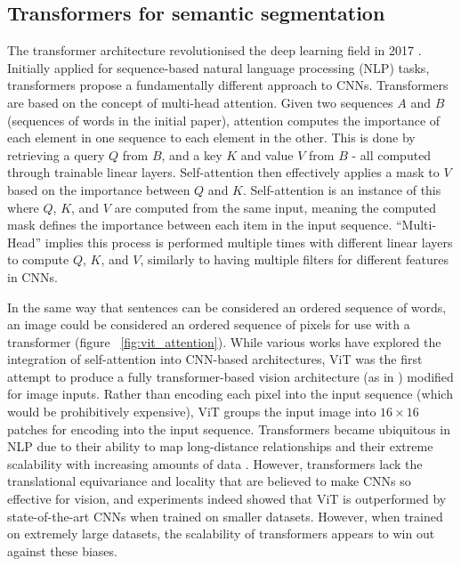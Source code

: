 \documentclass[a4paper,12pt]{report}
\begin{document}
    \subsection{Transformers for semantic segmentation}
    
    The transformer architecture revolutionised the deep learning field in 2017 \cite{vaswani_attention_2017}. Initially applied for sequence-based natural language processing (NLP) tasks, transformers propose a fundamentally different approach to CNNs. Transformers are based on the concept of multi-head attention. Given two sequences $A$ and $B$ (sequences of words in the initial paper), attention computes the importance of each element in one sequence to each element in the other. This is done by retrieving a query $Q$ from $B$, and a key $K$ and value $V$ from $B$ - all computed through trainable linear layers. Self-attention then effectively applies a mask to $V$ based on the importance between $Q$ and $K$. Self-attention is an instance of this where $Q$, $K$, and $V$ are computed from the same input, meaning the computed mask defines the importance between each item in the input sequence. “Multi-Head” implies this process is performed multiple times with different linear layers to compute $Q$, $K$, and $V$, similarly to having multiple filters for different features in CNNs.
    
    In the same way that sentences can be considered an ordered sequence of words, an image could be considered an ordered sequence of pixels for use with a transformer (figure ~\ref{fig:vit_attention}). While various works have explored the integration of self-attention into CNN-based architectures, ViT \cite{dosovitskiy_image_2021} was the first attempt to produce a fully transformer-based vision architecture (as in \cite{vaswani_attention_2017}) modified for image inputs. Rather than encoding each pixel into the input sequence (which would be prohibitively expensive), ViT groups the input image into $16 \times 16$ patches for encoding into the input sequence. Transformers became ubiquitous in NLP due to their ability to map long-distance relationships and their extreme scalability with increasing amounts of data \cite{devlin_bert_2019} \cite{radford_language_2019}. However, transformers lack the translational equivariance and locality that are believed to make CNNs so effective for vision, and experiments indeed showed that ViT is outperformed by state-of-the-art CNNs when trained on smaller datasets. However, when trained on extremely large datasets, the scalability of transformers appears to win out against these biases.
    
\end{document}
